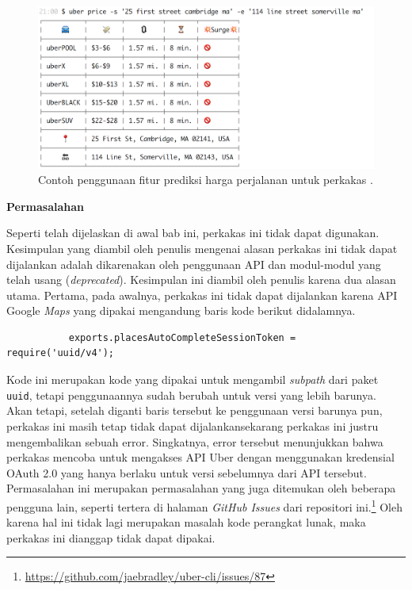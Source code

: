 \documentclass[a4paper,twoside]{article}
\begin{document}
\begin{enumerate}
\begin{figure}[ht]
    \centering
    \includegraphics[width=0.75\linewidth]{ubercli-price}
    \caption[Contoh penggunaan perkakas \ubercli (\textit{price})]{Contoh penggunaan fitur prediksi harga perjalanan untuk perkakas \ubercli.\protect\footnotemark}
    \label{fig:similarapps-ubercli-price}
\end{figure}

\textbf{Permasalahan}
\label{sec:similarapps-ubercli-problem}

Seperti telah dijelaskan di awal bab ini, perkakas ini tidak dapat digunakan. Kesimpulan yang diambil oleh penulis mengenai alasan perkakas ini tidak dapat dijalankan adalah dikarenakan oleh penggunaan API dan modul-modul yang telah usang (\textit{deprecated}). Kesimpulan ini diambil oleh penulis karena dua alasan utama. Pertama, pada awalnya, perkakas ini tidak dapat dijalankan karena API Google \textit{Maps} yang dipakai mengandung baris kode berikut didalamnya.

\begin{verbatim}
           exports.placesAutoCompleteSessionToken = require('uuid/v4');
\end{verbatim}

Kode ini merupakan kode yang dipakai untuk mengambil \textit{subpath} dari paket \verb|uuid|, tetapi penggunaannya sudah berubah untuk versi yang lebih barunya. Akan tetapi, setelah diganti baris tersebut ke penggunaan versi barunya pun, perkakas ini masih tetap tidak dapat dijalankan\textemdash sekarang perkakas ini justru mengembalikan sebuah error. Singkatnya, error tersebut menunjukkan bahwa perkakas mencoba untuk mengakses API Uber dengan menggunakan kredensial OAuth 2.0 yang hanya berlaku untuk versi sebelumnya dari API tersebut. Permasalahan ini merupakan permasalahan yang juga ditemukan oleh beberapa pengguna lain, seperti tertera di halaman \textit{GitHub Issues} dari repositori ini.\footnote{\href{https://github.com/jaebradley/uber-cli/issues/87}{https://github.com/jaebradley/uber-cli/issues/87}} Oleh karena hal ini tidak lagi merupakan masalah kode perangkat lunak, maka perkakas ini dianggap tidak dapat dipakai.


\end{enumerate}
\end{document}
